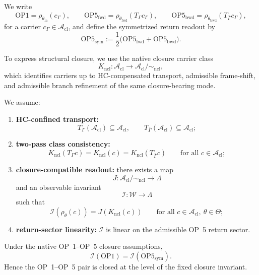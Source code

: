 We write
\[
\mathrm{OP1}=\rho_{\theta_{\mathrm{in}}}(c_{\Gamma}),
\qquad
\mathrm{OP5}_{\mathrm{fwd}}=\rho_{\theta_{\mathrm{fwd}}}(T_{\Gamma}c_{\Gamma}),
\qquad
\mathrm{OP5}_{\mathrm{bwd}}=\rho_{\theta_{\mathrm{bwd}}}(T_{\overline{\Gamma}}c_{\Gamma}),
\]
for a carrier $c_{\Gamma}\in\mathcal{A}_{\mathrm{cl}}$, and define the symmetrized return readout by
\[
\mathrm{OP5}_{\mathrm{sym}}
:=
\frac12\bigl(\mathrm{OP5}_{\mathrm{fwd}}+\mathrm{OP5}_{\mathrm{bwd}}\bigr).
\]

To express structural closure, we use the native closure carrier class
\[
K_{\mathrm{ncl}}:\mathcal{A}_{\mathrm{cl}}\to \mathcal{A}_{\mathrm{cl}}/\!\sim_{\mathrm{ncl}},
\]
which identifies carriers up to HC-compensated transport, admissible frame-shift, and admissible branch refinement of the same closure-bearing mode.

\begin{assumption}
We assume:
\begin{enumerate}[leftmargin=2em,label=(\roman*)]
\item \textbf{HC-confined transport:}
\[
T_{\Gamma}(\mathcal{A}_{\mathrm{cl}})\subseteq \mathcal{A}_{\mathrm{cl}},
\qquad
T_{\overline{\Gamma}}(\mathcal{A}_{\mathrm{cl}})\subseteq \mathcal{A}_{\mathrm{cl}};
\]

\item \textbf{two-pass class consistency:}
\[
K_{\mathrm{ncl}}(T_{\Gamma}c)=K_{\mathrm{ncl}}(c)=K_{\mathrm{ncl}}(T_{\overline{\Gamma}}c)
\qquad
\text{for all } c\in\mathcal{A}_{\mathrm{cl}};
\]

\item \textbf{closure-compatible readout:} there exists a map
\[
J:\mathcal{A}_{\mathrm{cl}}/\!\sim_{\mathrm{ncl}}\to\Lambda
\]
and an observable invariant
\[
\mathcal{I}:\mathcal{W}\to\Lambda
\]
such that
\[
\mathcal{I}(\rho_{\theta}(c))=J(K_{\mathrm{ncl}}(c))
\qquad
\text{for all } c\in\mathcal{A}_{\mathrm{cl}},\ \theta\in\Theta;
\]

\item \textbf{return-sector linearity:} $\mathcal{I}$ is linear on the admissible OP~5 return sector.
\end{enumerate}
\end{assumption}

\begin{theorem}\label{thm:op15-closure}
Under the native OP~1--OP~5 closure assumptions,
\[
\mathcal{I}(\mathrm{OP1})
=
\mathcal{I}(\mathrm{OP5}_{\mathrm{sym}}).
\]
Hence the OP~1--OP~5 pair is closed at the level of the fixed closure invariant.
\end{theorem}

